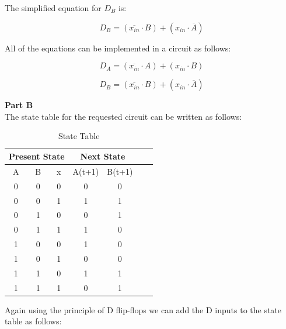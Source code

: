 \documentclass[table ]{article}
\begin{document}
The simplified equation for \(D_B\) is: 

\begin{equation}
    D_B = (\overline{x_{in}} \cdot B) + (x_{in} \cdot \overline{A})
\end{equation}


All of the equations can be implemented in a circuit as follows:

\begin{equation}
    D_A = (\overline{x_{in}} \cdot A) + (x_{in} \cdot B) 
\end{equation}

\begin{equation}
    D_B = (\overline{x_{in}} \cdot B) + (x_{in} \cdot \overline{A})
\end{equation}

\textbf{Part B} \\

The state table for the requested circuit can be written as follows:


\begin{table}[H]
    \centering
    \caption{State Table}

    \begin{tabular}{|c|c|c|c|c|c|c|}
        \hline
        \multicolumn{3}{|c|}{Present State} & \multicolumn{2}{c|}{Next State} \\
        \hline
        A & B & x & A(t+1) & B(t+1)  \\
        \hline
        0 & 0 & 0 & 0 & 0 \\
        0 & 0 & 1 & 1 & 1 \\
        \hline
        0 & 1 & 0 & 0 & 1 \\
        0 & 1 & 1 & 1 & 0 \\
        \hline
        1 & 0 & 0 & 1 & 0 \\
        1 & 0 & 1 & 0 & 0 \\
        \hline
        1 & 1 & 0 & 1 & 1 \\
        1 & 1 & 1 & 0 & 1 \\
        \hline
\end{tabular}
\end{table}

Again using the principle of D flip-flops we can add the D inputs to the state table as follows:
\end{document}
